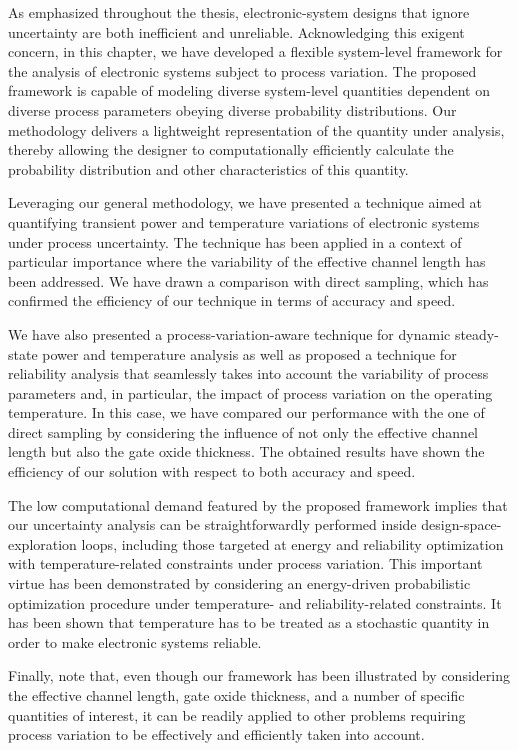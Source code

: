 As emphasized throughout the thesis, electronic-system designs that ignore
uncertainty are both inefficient and unreliable. Acknowledging this exigent
concern, in this chapter, we have developed a flexible system-level framework
for the analysis of electronic systems subject to process variation. The
proposed framework is capable of modeling diverse system-level quantities
dependent on diverse process parameters obeying diverse probability
distributions. Our methodology delivers a lightweight representation of the
quantity under analysis, thereby allowing the designer to computationally
efficiently calculate the probability distribution and other characteristics of
this quantity.

Leveraging our general methodology, we have presented a technique aimed at
quantifying transient power and temperature variations of electronic systems
under process uncertainty. The technique has been applied in a context of
particular importance where the variability of the effective channel length has
been addressed. We have drawn a comparison with direct sampling, which has
confirmed the efficiency of our technique in terms of accuracy and speed.

We have also presented a process-variation-aware technique for dynamic
steady-state power and temperature analysis as well as proposed a technique for
reliability analysis that seamlessly takes into account the variability of
process parameters and, in particular, the impact of process variation on the
operating temperature. In this case, we have compared our performance with the
one of direct sampling by considering the influence of not only the effective
channel length but also the gate oxide thickness. The obtained results have
shown the efficiency of our solution with respect to both accuracy and speed.

The low computational demand featured by the proposed framework implies that our
uncertainty analysis can be straightforwardly performed inside
design-space-exploration loops, including those targeted at energy and
reliability optimization with temperature-related constraints under process
variation. This important virtue has been demonstrated by considering an
energy-driven probabilistic optimization procedure under temperature- and
reliability-related constraints. It has been shown that temperature has to be
treated as a stochastic quantity in order to make electronic systems reliable.

Finally, note that, even though our framework has been illustrated by
considering the effective channel length, gate oxide thickness, and a number of
specific quantities of interest, it can be readily applied to other problems
requiring process variation to be effectively and efficiently taken into
account.
